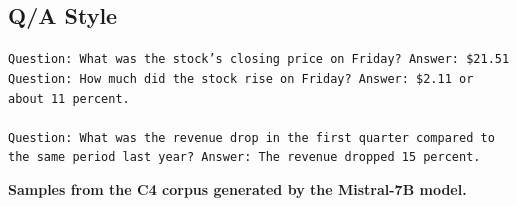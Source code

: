 \subsection*{Q/A Style}
\begin{tcolorbox}[colback=gray!20, colframe=gray!75, rounded corners, sharp corners=northeast, sharp corners=southwest]
\texttt{Question: What was the stock's closing price on Friday? Answer: \$21.51 Question: How much did the stock rise on Friday? Answer: \$2.11 or about 11 percent.\\\\
Question: What was the revenue drop in the first quarter compared to the same period last year? Answer: The revenue dropped 15 percent.}
\end{tcolorbox}

\clearpage

\textbf{Samples from the C4 corpus generated by the Mistral-7B model.}

